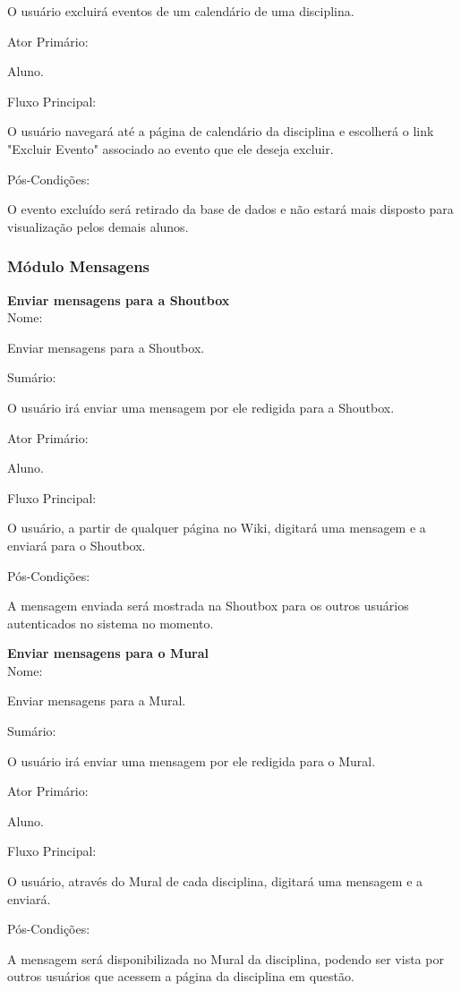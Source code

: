 \documentclass[11pt]{article}
\begin{document}
      O usuário excluirá eventos de um calendário de uma disciplina. 

Ator Primário:

      Aluno. 

Fluxo Principal:

      O usuário navegará até a página de calendário da disciplina e escolherá o link "Excluir Evento" associado ao evento que ele deseja excluir. 

Pós-Condições:

      O evento excluído será retirado da base de dados e não estará mais disposto para visualização pelos demais alunos. 

\subsubsection{Módulo Mensagens}
\textbf{Enviar mensagens para a Shoutbox}
\\

Nome:

      Enviar mensagens para a Shoutbox. 

Sumário:

      O usuário irá enviar uma mensagem por ele redigida para a Shoutbox. 

Ator Primário:

      Aluno. 

Fluxo Principal:

      O usuário, a partir de qualquer página no Wiki, digitará uma mensagem e a enviará para o Shoutbox. 

Pós-Condições:

      A mensagem enviada será mostrada na Shoutbox para os outros usuários autenticados no sistema no momento. 

\textbf{Enviar mensagens para o Mural}
\\

Nome:

      Enviar mensagens para a Mural. 

Sumário:

      O usuário irá enviar uma mensagem por ele redigida para o Mural. 

Ator Primário:

      Aluno. 

Fluxo Principal:

      O usuário, através do Mural de cada disciplina, digitará uma mensagem e a enviará. 

Pós-Condições:

      A mensagem será disponibilizada no Mural da disciplina, podendo ser vista por outros usuários que acessem a página da disciplina em questão. 
\end{document}
